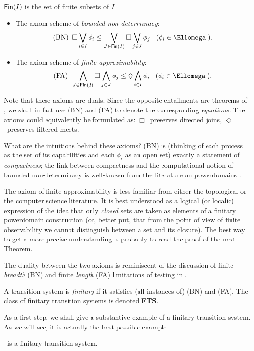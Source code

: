 ${\sf Fin}(I)$ is the set of finite subsets of $I$.
\begin{itemize}
\item The axiom scheme of {\em bounded non-determinacy}:
\[ \mbox{(BN)} \;\; \Box \bigvee_{i \in I} \phi_{i} \leq \bigvee_{J \in {\sf Fin}(I)} \Box \bigvee_{j \in J} \phi_{j} \;\;\; (\phi_{i} \in \Ellomega\ ). \]
\item The axiom scheme of {\em finite approximability}:
\[ \mbox{(FA)} \;\; \bigwedge_{J \in {\sf Fin}(I)} \Box \bigwedge_{j \in J} \phi_{j}  \leq \Diamond \bigwedge_{i \in I} \phi_{i} \;\;\; (\phi_{i} \in \Ellomega\ ). \]
\end{itemize}

Note that these axioms are duals.
Since the opposite entailments are theorems of {\Ellinfty}, we shall in fact use (BN) and (FA) to denote the corresponding {\em equations}.
The axioms could equivalently be formulated as: $\Box$~preserves directed joins, $\Diamond$~preserves filtered meets.

What are the intuitions behind these axioms?
(BN) is (thinking of each process as the set of its capabilities and each $\phi_{i}$ as an open set) exactly a statement of {\em compactness}; the link between compactness and the computational notion of bounded non-determinacy is well-known from the literature on powerdomains \cite{PloLN,Smy83}.

The axiom of finite approximability is less familiar from either the topological or the computer science literature.
It is best understood as a logical (or localic) expression of the idea that only {\em closed} sets are taken as elements of a finitary powerdomain construction (or, better put, that from the point of view of finite observability we cannot distinguish between a set and its closure).
The best way to get a more precise understanding is probably to read the proof of the next Theorem.

The duality between the two axioms is reminiscent of the discussion of finite {\em breadth} (BN) and finite {\em length} (FA) limitations of testing in \cite{Abr83a}.

\begin{definition}
\label{fts}
{\rm A transition system is {\em finitary} if it satisfies (all instances of) (BN) and (FA).
The class of finitary transition systems is denoted {\bf FTS}.}
\end{definition}

As a first step, we shall give a substantive example of a finitary transition system.
As we will see, it is actually the best possible example.
\begin{theorem}
\Dom\ is a finitary transition system.
\end{theorem}


